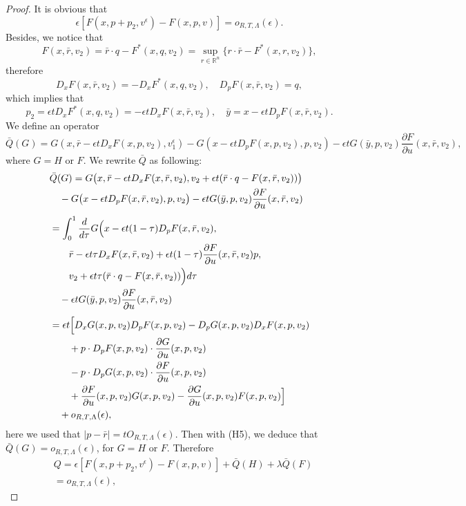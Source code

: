 \documentclass[preprint]{elsarticle}
\numberwithin{equation}{section}
\begin{document}
\begin{proof}
   It is obvious that 
    \begin{equation}
        \epsilon[F(x,p+p_2,v^{\epsilon})-F(x,p,v)]=o_{R,T,\Lambda}(\epsilon).
    \end{equation}
    Besides, we notice that
    \begin{equation}
        F(x,\bar r,v_2)=\bar r\cdot q-F^*(x,q,v_2)=\underset{r\in \mathbb R^n}{\sup} \{r\cdot \bar r-F^*(x,r,v_2)\},
    \end{equation}
    therefore
    \begin{equation}
        D_xF(x,\bar r,v_2)=-D_xF^*(x,q,v_2),\quad D_pF(x,\bar r,v_2)=q,
    \end{equation}
    which implies that\
    \begin{equation}
        p_2=\epsilon tD_xF^*(x,q,v_2)=-\epsilon t D_xF(x,\bar r,v_2), \quad \bar y=x-\epsilon tD_pF(x,\bar r,v_2).
    \end{equation}
    We define an operator 
    \begin{equation}
        \bar Q(G)=G(x,\bar r-\epsilon tD_xF(x,p,v_2),v^{\epsilon}_1)-G(x-\epsilon tD_pF(x,p,v_2),p,v_2)-\epsilon tG(\bar y,p,v_2)\frac{\partial F}{\partial u}(x,\bar r,v_2),
    \end{equation}
    where $G=H$ or $F$.
    We rewrite $\bar Q$ as following:
 \begin{align*}
&\bar Q(G) = G\bigl(x,\bar r-\epsilon tD_xF(x,\bar r,v_2),v_2+\epsilon t(\bar r\cdot q-F(x,\bar r,v_2))\bigr) \\
&\quad -G\bigl(x-\epsilon tD_pF(x,\bar r,v_2),p,v_2\bigr)-\epsilon tG(\bar y,p,v_2)\frac{\partial F}{\partial u}(x,\bar r,v_2)\\[4pt]
&= \int_0^1 \frac{d}{d\tau} G\Bigl(x-\epsilon t(1-\tau)D_pF(x,\bar r,v_2), \\
&\qquad \bar r-\epsilon t\tau D_xF(x,\bar r,v_2)+\epsilon t(1-\tau)\frac{\partial F}{\partial u}(x,\bar r,v_2)p, \\
&\qquad v_2+\epsilon t\tau (\bar r\cdot q-F(x,\bar r,v_2))\Bigr) d\tau \\
&\quad -\epsilon tG(\bar y,p,v_2)\frac{\partial F}{\partial u}(x,\bar r,v_2)\\[4pt]
&= \epsilon t\Bigl[ D_x G(x,p,v_2) D_pF(x,p,v_2)- D_p G(x,p,v_2) D_xF(x,p,v_2) \\
&\qquad + p \cdot D_pF(x,p,v_2) \cdot \frac{\partial G}{\partial u}(x,p,v_2) \\
&\qquad - p \cdot D_pG(x,p,v_2) \cdot \frac{\partial F}{\partial u}(x,p,v_2) \\
&\qquad + \frac{\partial F}{\partial u}(x,p,v_2) G(x,p,v_2)-\frac{\partial G}{\partial u}(x,p,v_2) F(x,p,v_2)\Bigr] \\
&\quad + o_{R,T,\Lambda}(\epsilon),
\end{align*}
   here we used that $|p-\bar r|=tO_{R,T,\Lambda}(\epsilon)$. Then with (H5), we deduce that $\bar Q(G)=o_{R,T,\Lambda}(\epsilon)$, for $G=H$ or $F$. Therefore
\begin{align*}
    & Q=\epsilon[F(x,p+p_2,v^{\epsilon})-F(x,p,v)]+\bar Q(H)+\lambda \bar Q(F)\\
    &=o_{R,T,\Lambda}(\epsilon),
\end{align*}
   
\end{proof}
\end{document}
